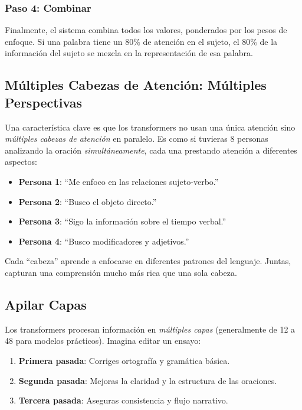 \documentclass[11pt,a4paper]{article}
\begin{document}
\subsubsection{Paso 4: Combinar}

Finalmente, el sistema combina todos los valores, ponderados por los pesos de enfoque. Si una palabra tiene un 80\% de atención en el sujeto, el 80\% de la información del sujeto se mezcla en la representación de esa palabra.

\subsection{Múltiples Cabezas de Atención: Múltiples Perspectivas}

Una característica clave es que los transformers no usan una única atención sino \emph{múltiples cabezas de atención} en paralelo. Es como si tuvieras 8 personas analizando la oración \emph{simultáneamente}, cada una prestando atención a diferentes aspectos:

\begin{itemize}[leftmargin=*]
    \item \textbf{Persona 1}: ``Me enfoco en las relaciones sujeto-verbo.''
    \item \textbf{Persona 2}: ``Busco el objeto directo.''
    \item \textbf{Persona 3}: ``Sigo la información sobre el tiempo verbal.''
    \item \textbf{Persona 4}: ``Busco modificadores y adjetivos.''
\end{itemize}

Cada ``cabeza'' aprende a enfocarse en diferentes patrones del lenguaje. Juntas, capturan una comprensión mucho más rica que una sola cabeza.

\subsection{Apilar Capas}

Los transformers procesan información en \emph{múltiples capas} (generalmente de 12 a 48 para modelos prácticos). Imagina editar un ensayo:
\begin{enumerate}[leftmargin=*]
    \item \textbf{Primera pasada}: Corriges ortografía y gramática básica.
    \item \textbf{Segunda pasada}: Mejoras la claridad y la estructura de las oraciones.
    \item \textbf{Tercera pasada}: Aseguras consistencia y flujo narrativo.
\end{enumerate}
\end{document}
